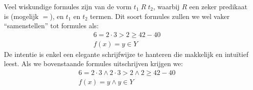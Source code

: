 Veel wiskundige formules zijn van de vorm $t_1\; R\; t_2$, waarbij $R$ een zeker predikaat is (mogelijk $=$), en $t_1$ en $t_2$ termen. Dit soort formules zullen we wel vaker “samenstellen” tot formules als:
\begin{gather*}
  6 = 2 \cdot 3 > 2 \ge 42 - 40 \\
  f(x) = y \in Y
\end{gather*}
De intentie is enkel een elegante schrijfwijze te hanteren die makkelijk en intuïtief leest.
Als we bovenstaande formules uitschrijven krijgen we:
\begin{gather*}
  6 = 2 \cdot 3 \land 2 \cdot 3 > 2 \land 2 \ge 42 - 40 \\
  f(x) = y \land y \in Y
\end{gather*}

